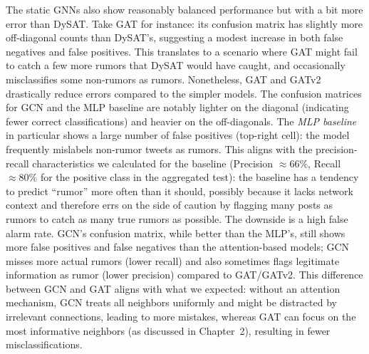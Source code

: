 \documentclass{cshonours}
\begin{document}
The static GNNs also show reasonably balanced performance but with a bit more error than DySAT. Take GAT for instance: its confusion matrix has slightly more off-diagonal counts than DySAT's, suggesting a modest increase in both false negatives and false positives. This translates to a scenario where GAT might fail to catch a few more rumors that DySAT would have caught, and occasionally misclassifies some non-rumors as rumors. Nonetheless, GAT and GATv2 drastically reduce errors compared to the simpler models. The confusion matrices for GCN and the MLP baseline are notably lighter on the diagonal (indicating fewer correct classifications) and heavier on the off-diagonals. The \emph{MLP baseline} in particular shows a large number of false positives (top-right cell): the model frequently mislabels non-rumor tweets as rumors. This aligns with the precision-recall characteristics we calculated for the baseline (Precision $\approx 66\%$, Recall $\approx 80\%$ for the positive class in the aggregated test): the baseline has a tendency to predict ``rumor'' more often than it should, possibly because it lacks network context and therefore errs on the side of caution by flagging many posts as rumors to catch as many true rumors as possible. The downside is a high false alarm rate. GCN's confusion matrix, while better than the MLP's, still shows more false positives and false negatives than the attention-based models; GCN misses more actual rumors (lower recall) and also sometimes flags legitimate information as rumor (lower precision) compared to GAT/GATv2. This difference between GCN and GAT aligns with what we expected: without an attention mechanism, GCN treats all neighbors uniformly and might be distracted by irrelevant connections, leading to more mistakes, whereas GAT can focus on the most informative neighbors (as discussed in Chapter~2), resulting in fewer misclassifications.
\end{document}
